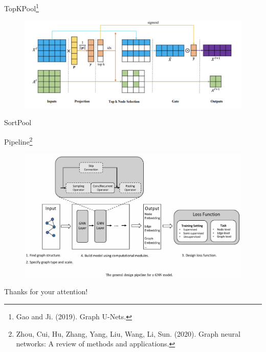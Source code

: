 \documentclass{beamer}
\begin{document}
\begin{frame}{TopKPool\footnote{Gao and Ji. (2019).
Graph U-Nets.}}
\begin{figure}
\includegraphics[width=0.95\linewidth]{Images/TopKpool.png}
\end{figure}
\end{frame}

\begin{frame}{SortPool}
\end{frame}
\begin{frame}{Pipeline\footnote{Zhou, Cui, Hu, Zhang, Yang, Liu, Wang, Li, Sun. (2020).
Graph neural networks: A review of methods and applications.}}
\begin{figure}
\includegraphics[width=0.95\linewidth]{Images/GNN_pipeline.jpg}
\end{figure}
\end{frame}
\begin{frame}
\begin{center}
\Huge Thanks for your attention!
\end{center}
\end{frame}
\end{document}
